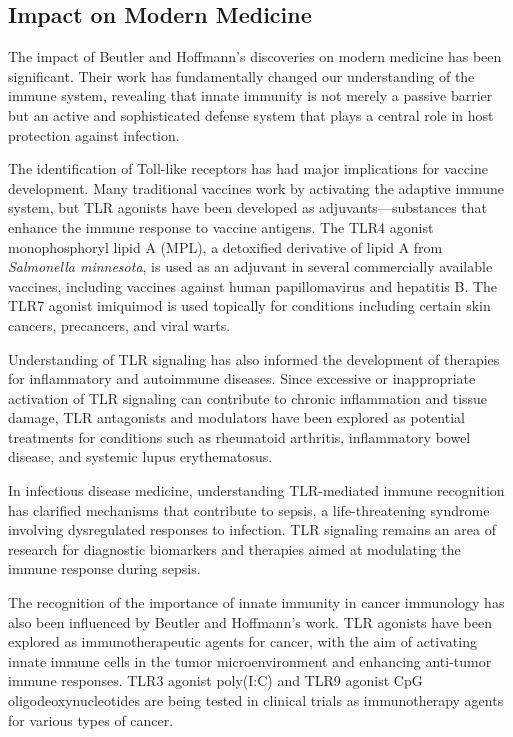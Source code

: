 \subsection{Impact on Modern Medicine}

The impact of Beutler and Hoffmann's discoveries on modern medicine has been significant. Their work has fundamentally changed our understanding of the immune system, revealing that innate immunity is not merely a passive barrier but an active and sophisticated defense system that plays a central role in host protection against infection.

The identification of Toll-like receptors has had major implications for vaccine development. Many traditional vaccines work by activating the adaptive immune system, but TLR agonists have been developed as adjuvants---substances that enhance the immune response to vaccine antigens. The TLR4 agonist monophosphoryl lipid A (MPL), a detoxified derivative of lipid A from \textit{Salmonella minnesota}, is used as an adjuvant in several commercially available vaccines, including vaccines against human papillomavirus and hepatitis B. The TLR7 agonist imiquimod is used topically for conditions including certain skin cancers, precancers, and viral warts.

Understanding of TLR signaling has also informed the development of therapies for inflammatory and autoimmune diseases. Since excessive or inappropriate activation of TLR signaling can contribute to chronic inflammation and tissue damage, TLR antagonists and modulators have been explored as potential treatments for conditions such as rheumatoid arthritis, inflammatory bowel disease, and systemic lupus erythematosus.

In infectious disease medicine, understanding TLR-mediated immune recognition has clarified mechanisms that contribute to sepsis, a life-threatening syndrome involving dysregulated responses to infection. TLR signaling remains an area of research for diagnostic biomarkers and therapies aimed at modulating the immune response during sepsis.

The recognition of the importance of innate immunity in cancer immunology has also been influenced by Beutler and Hoffmann's work. TLR agonists have been explored as immunotherapeutic agents for cancer, with the aim of activating innate immune cells in the tumor microenvironment and enhancing anti-tumor immune responses. TLR3 agonist poly(I:C) and TLR9 agonist CpG oligodeoxynucleotides are being tested in clinical trials as immunotherapy agents for various types of cancer.

